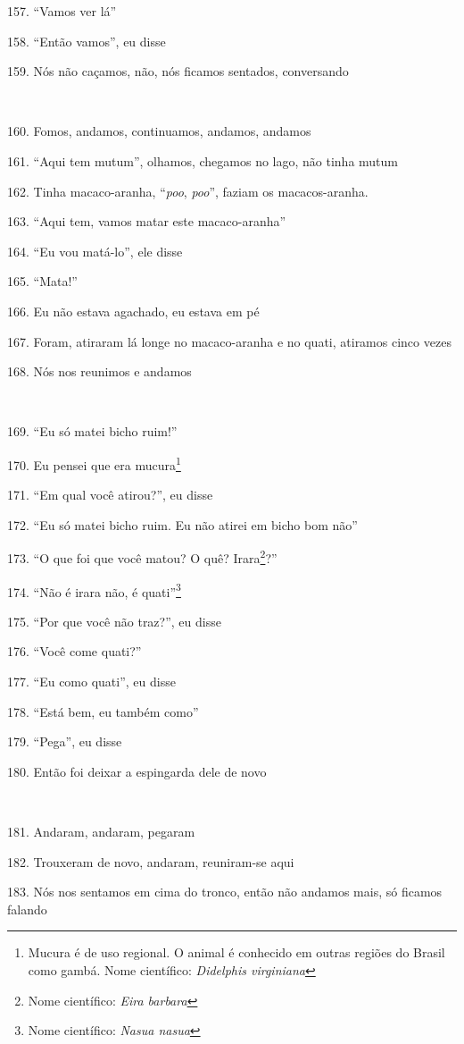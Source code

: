 157. ``Vamos ver lá''

158. ``Então vamos'', eu disse

159. Nós não caçamos, não, nós ficamos sentados, conversando

~

160. Fomos, andamos, continuamos, andamos, andamos

161. ``Aqui tem mutum'', olhamos, chegamos no lago, não tinha mutum

162. Tinha macaco-aranha, ``\emph{poo}, \emph{poo}'', faziam os
macacos-aranha. 

163. ``Aqui tem, vamos matar este macaco-aranha''

164. ``Eu vou matá-lo'', ele disse

165. ``Mata!''

166. Eu não estava agachado, eu estava em pé

167. Foram, atiraram lá longe no macaco-aranha e no quati, atiramos cinco
vezes

168. Nós nos reunimos e andamos

~

169. ``Eu só matei bicho ruim!''

170. Eu pensei que era mucura\footnote{Mucura é de uso regional. O animal
  é conhecido em outras regiões do Brasil como gambá. Nome científico:
  \emph{Didelphis virginiana}}

171. ``Em qual você atirou?'', eu disse

172. ``Eu só matei bicho ruim. Eu não atirei em bicho bom não''

173. ``O que foi que você matou? O quê? Irara\footnote{Nome científico:
  \emph{Eira barbara}}?''

174. ``Não é irara não, é quati''\footnote{Nome científico: \emph{Nasua
  nasua}}

175. ``Por que você não traz?'', eu disse

176. ``Você come quati?''

177. ``Eu como quati'', eu disse

178. ``Está bem, eu também como''

179. ``Pega'', eu disse

180. Então foi deixar a espingarda dele de novo

~

181. Andaram, andaram, pegaram

182. Trouxeram de novo, andaram, reuniram-se aqui

183. Nós nos sentamos em cima do tronco, então não andamos mais, só
ficamos falando

